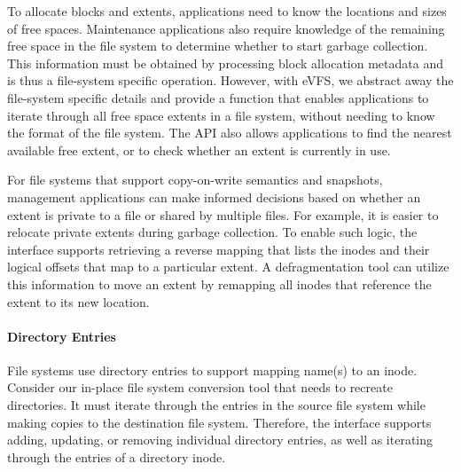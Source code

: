 To allocate blocks and extents, applications need to know the locations and sizes of free spaces. Maintenance applications also require knowledge of the remaining free space in the file system to determine whether to start garbage collection. This information must be obtained by processing block allocation metadata and is thus a file-system specific operation. However, with eVFS, we abstract away the file-system specific details and provide a function that enables applications to iterate through all free space extents in a file system, without needing to know the format of the file system. The API also allows applications to find the nearest available free extent, or to check whether an extent is currently in use.



For file systems that support copy-on-write semantics and snapshots, management applications can make informed decisions based on whether an extent is private to a file or shared by multiple files. For example, it is easier to relocate private extents during garbage collection. To enable such logic, the interface supports retrieving a reverse mapping that lists the inodes and their logical offsets that map to a particular extent. A defragmentation tool can utilize this information to move an extent by remapping all inodes that reference the extent to its new location.

\vspace{-0.25em}
\paragraph{Directory Entries} File systems use directory entries to support mapping name(s) to an inode. Consider our in-place file system conversion tool that needs to recreate directories. It must iterate through the entries in the source file system while making copies to the destination file system. Therefore, the interface supports adding, updating, or removing individual directory entries, as well as iterating through the entries of a directory inode.

